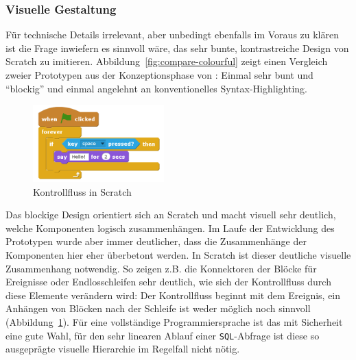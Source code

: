 \subsubsection{Visuelle Gestaltung}

Für technische Details irrelevant, aber unbedingt ebenfalls im Voraus zu klären ist die Frage inwiefern es sinnvoll wäre, das sehr bunte, kontrastreiche Design von Scratch zu imitieren. Abbildung~\ref{fig:compare-colourful} zeigt einen Vergleich zweier Prototypen aus der Konzeptionsphase von \idename{}: Einmal sehr bunt und "`blockig"' und einmal angelehnt an konventionelles Syntax-Highlighting.

\begin{figure}
  \includegraphics[width=0.45\textwidth]{images/scratch-control-flow}
  \caption{Kontrollfluss in Scratch}
  \label{fig:screen-scratch-control-flow}
\end{figure}

Das blockige Design orientiert sich an Scratch und macht visuell sehr deutlich, welche Komponenten logisch zusammenhängen. Im Laufe der Entwicklung des Prototypen wurde aber immer deutlicher, dass die Zusammenhänge der Komponenten hier eher überbetont werden. In Scratch ist dieser deutliche visuelle Zusammenhang notwendig. So zeigen z.B. die Konnektoren der Blöcke für Ereignisse oder Endlosschleifen sehr deutlich, wie sich der Kontrollfluss durch diese Elemente verändern wird: Der Kontrollfluss beginnt mit dem Ereignis, ein Anhängen von Blöcken nach der Schleife ist weder möglich noch sinnvoll (Abbildung~\ref{fig:screen-scratch-control-flow}).  Für eine vollständige Programmiersprache ist das mit Sicherheit eine gute Wahl, für den sehr linearen Ablauf einer \texttt{SQL}-Abfrage ist diese so ausgeprägte visuelle Hierarchie im Regelfall nicht nötig.

